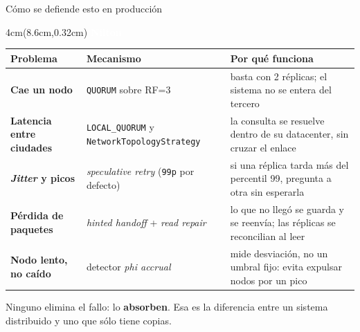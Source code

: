 \documentclass[aspectratio=169,11pt]{beamer}
\newcommand{\quien}[1]{%
  \begin{textblock*}{4cm}(8.6cm,0.32cm)
    \tiny\textcolor{white}{\textbf{#1}}
  \end{textblock*}}
\begin{document}
\begin{frame}{Cómo se defiende esto en producción}
\quien{Nilton}
\footnotesize
\begin{tabular}{@{}p{2.4cm}p{3.7cm}p{4.5cm}@{}}
\toprule
\textbf{Problema} & \textbf{Mecanismo} & \textbf{Por qué funciona} \\
\midrule
\textbf{Cae un nodo}
  & \texttt{QUORUM} sobre RF=3
  & basta con 2 réplicas; el sistema no se entera del tercero \\
\addlinespace
\textbf{Latencia entre ciudades}
  & \texttt{LOCAL\_QUORUM} y \texttt{NetworkTopologyStrategy}
  & la consulta se resuelve dentro de su datacenter, sin cruzar el enlace \\
\addlinespace
\textbf{\emph{Jitter} y picos}
  & \emph{speculative retry} \newline (\texttt{99p} por defecto)
  & si una réplica tarda más del percentil 99, pregunta a otra sin esperarla \\
\addlinespace
\textbf{Pérdida de paquetes}
  & \emph{hinted handoff} + \emph{read repair}
  & lo que no llegó se guarda y se reenvía; las réplicas se reconcilian al leer \\
\addlinespace
\textbf{Nodo lento, no caído}
  & detector \emph{phi accrual}
  & mide desviación, no un umbral fijo: evita expulsar nodos por un pico \\
\bottomrule
\end{tabular}

\vspace{5pt}
\centering\scriptsize
\textcolor{cmGris}{Ninguno elimina el fallo: lo \textbf{absorben}. Esa es la
diferencia entre un sistema distribuido y uno que sólo tiene copias.}
\end{frame}
\end{document}
